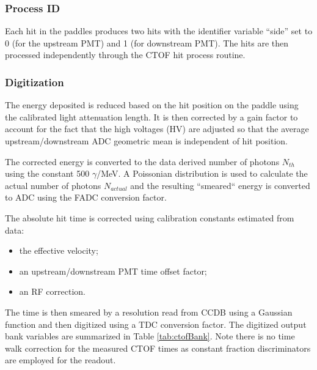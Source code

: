 \subsubsection{Process ID}

Each hit in the paddles produces two hits with the identifier variable ``side'' set to 0 (for the upstream PMT) and 1 (for downstream PMT).
The hits are then processed independently through the CTOF hit process routine.

\subsubsection{Digitization}

The energy deposited is reduced based on the hit position on the paddle using the calibrated light attenuation length.
It is then corrected by a gain factor to account for the fact that the high voltages (HV) are adjusted so that
the average upstream/downstream ADC geometric mean is independent of hit position.

The corrected energy is converted to the data derived number of photons $N_{th}$ using the constant 500 $\gamma$/MeV.
A Poissonian distribution is used to calculate the actual number of photons $N_{actual}$ and the resulting ``smeared``
energy is converted to ADC using the FADC conversion factor.


The absolute hit time is corrected using calibration constants estimated from data:

\begin{itemize}
	\item the effective velocity;
	\item an upstream/downstream PMT time offset factor;
	\item an RF correction.
\end{itemize}

The time is then smeared by a resolution read from CCDB using a Gaussian function and then digitized using a TDC conversion factor.
The digitized output bank variables are summarized in Table \ref{tab:ctofBank}.
Note there is no time walk correction for the measured CTOF times as constant fraction discriminators
are employed for the readout.


